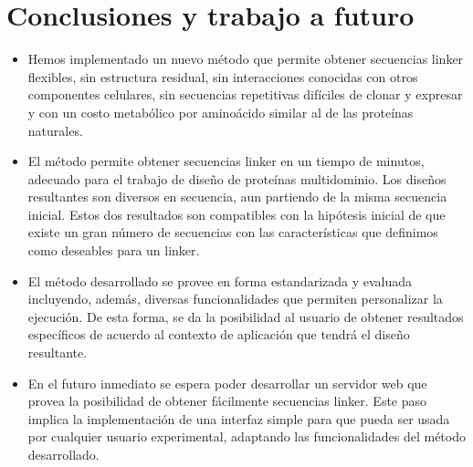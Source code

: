\chapter{Conclusiones y trabajo a futuro} \label{conclusiones}


\begin{itemize}

 \item Hemos implementado un nuevo método que permite obtener secuencias linker flexibles, sin estructura residual, sin interacciones conocidas con otros componentes celulares, sin secuencias repetitivas difíciles de clonar y expresar y con un costo metabólico por aminoácido similar al de las proteínas naturales.

\item El método permite obtener secuencias linker en un tiempo de minutos, adecuado para el trabajo de diseño de proteínas multidominio. Los diseños resultantes son diversos en secuencia, aun partiendo de la misma secuencia inicial. Estos dos resultados son compatibles con la hipótesis inicial de que existe un gran número de secuencias con las características que definimos como deseables para un linker.

 \item El método desarrollado se provee en forma estandarizada y evaluada incluyendo, además, diversas funcionalidades que permiten personalizar la ejecución. De esta forma, se da la posibilidad al usuario de obtener resultados específicos de acuerdo al contexto de aplicación que tendrá el diseño resultante.

 \item En el futuro inmediato se espera poder desarrollar un servidor web que provea la posibilidad de obtener fácilmente secuencias linker. Este paso implica la implementación de una interfaz simple para que pueda ser usada por cualquier usuario experimental, adaptando las funcionalidades del método desarrollado. 
\end{itemize}








